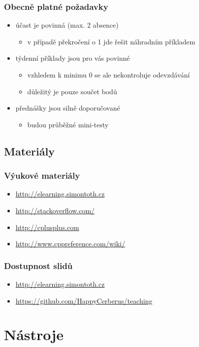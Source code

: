 \begin{frame}
	\frametitle{Obecně platné požadavky}
	\begin{itemize}
		\item{účast je povinná (max. 2 absence)}
		\begin{itemize}
			\item{v případě překročení o 1 jde řešit náhradním příkladem}
		\end{itemize}
		\item{týdenní příklady jsou pro vás povinné}
		\begin{itemize}
			\item{vzhledem k minimu 0 se ale nekontroluje odevzdávání}
			\item{důležitý je pouze součet bodů}
		\end{itemize}
		\item{přednášky jsou silně doporučované}
		\begin{itemize}
			\item{budou průběžné mini-testy}
		\end{itemize}
	\end{itemize}
\end{frame}

\subsection{Materiály}

\begin{frame}
	\frametitle{Výukové materiály}
	\begin{itemize}
		\item{\url{http://elearning.simontoth.cz}}
		\item{\url{http://stackoverflow.com/}}
		\item{\url{http://cplusplus.com}}
		\item{\url{http://www.cppreference.com/wiki/}}
	\end{itemize}
\end{frame}

\begin{frame}
	\frametitle{Dostupnost slidů}
	\begin{itemize}
		\item{\url{http://elearning.simontoth.cz}}
		\item{\url{https://github.com/HappyCerberus/teaching}}
	\end{itemize}
\end{frame}

\section{Nástroje}
